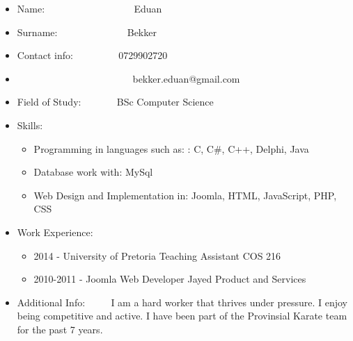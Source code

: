 \documentclass[12pt]{article}
\begin{document}
\begin{itemize}
	\item Name: \ ~~~~~~~~~~~~~~~ \ Eduan
	\item Surname: \ ~~~~~~~~~~~ \ Bekker
	\item Contact info: \ ~~~~~~ \  0729902720
	\item \ ~~~~~~~~~~~~~~~~~~~~~ \ bekker.eduan@gmail.com
	\item Field of Study: \ ~~~~ \ BSc Computer Science
	\item Skills: \begin{itemize}
					\item Programming in languages such as: : C, C\#, C++, Delphi, Java
					\item Database work with: MySql
					\item Web Design and Implementation in: Joomla, HTML, JavaScript, PHP, CSS 
				  \end{itemize}
			\item Work Experience:
				  \begin{itemize}
							\item 2014 - University of Pretoria Teaching Assistant COS 216
							\item 2010-2011 - Joomla Web Developer Jayed Product and Services
						\end{itemize}
		\item Additional Info: \ ~~ \ I am a hard worker that thrives under pressure. I enjoy being competitive and active. I have been part of the Provinsial Karate team for the past 7 years.	
\end{itemize}
\end{document}

